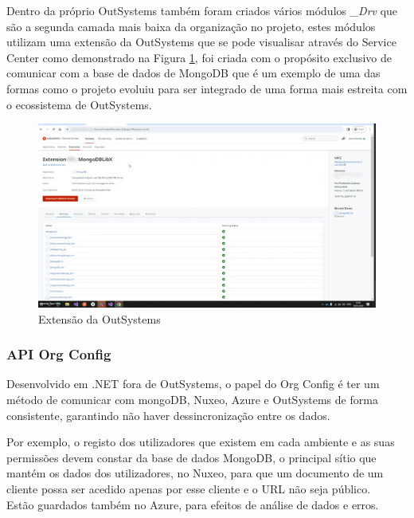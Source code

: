                 Dentro da próprio OutSystems também foram criados vários módulos \textit{\_Drv} que são a segunda camada mais baixa da organização no projeto, estes módulos utilizam uma extensão da OutSystems que se pode visualisar através do Service Center como demonstrado na Figura \ref{fig:os-extension}, foi criada com o propósito exclusivo de comunicar com a base de dados de MongoDB que é um exemplo de uma das formas como o projeto evoluiu para ser integrado de uma forma mais estreita com o ecossistema de OutSystems.

                \begin{figure}[htbp]
                    \centering
                    \includegraphics[scale=0.35]{imgs/ExtensionEndpoint-outsystems.png}
                    \caption{Extensão da OutSystems}\label{fig:os-extension}
                \end{figure}

            \subsubsection{API Org Config}\label{secsec:api-org-config}
            
                Desenvolvido em .NET fora de OutSystems, o papel do Org Config é ter um método de comunicar com mongoDB, Nuxeo, Azure e OutSystems de forma consistente, garantindo não haver dessincronização entre os dados.

                Por exemplo, o registo dos utilizadores que existem em cada ambiente e as suas permissões devem constar da base de dados MongoDB, o principal sítio que mantém os dados dos utilizadores, no Nuxeo, para que um documento de um cliente possa ser acedido apenas por esse cliente e o URL não seja público. \\
                Estão guardados também no Azure, para efeitos de análise de dados e erros.

